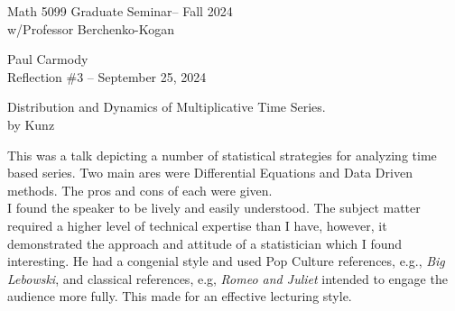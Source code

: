 \documentclass[10pt,a4paper]{report}
\newcommand{\CLASSNAME}{Math 5099 Graduate Seminar}
\newcommand{\STUDENTNAME}{Paul Carmody}
\newcommand{\ASSIGNMENT}{Reflection \#3 }
\newcommand{\DUEDATE}{September 25, 2024}
\newcommand{\SEMESTER}{Fall 2024}
\begin{document}
\begin{center}
	\Large{\CLASSNAME -- \SEMESTER} \\
	\large{ w/Professor Berchenko-Kogan}
\end{center}
\begin{center}
	\STUDENTNAME \\
	\ASSIGNMENT -- \DUEDATE\\
\end{center} 

\begin{center}
\Large{Distribution and Dynamics of Multiplicative Time Series.  }\\by Kunz\\
\end{center}

This was a talk depicting a number of statistical strategies for analyzing time based series.  Two main ares were Differential Equations and Data Driven methods.  The pros and cons of each were given.\\
I found the speaker to be lively and easily understood. The subject matter required a higher level of technical expertise than I have, however, it demonstrated the approach and attitude of a statistician which I found interesting.  He had a congenial style and used Pop Culture references, e.g., \textit{Big Lebowski}, and classical references, e.g, \textit{Romeo and Juliet} intended to engage the audience more fully. This made for an effective lecturing style.
\end{document}
